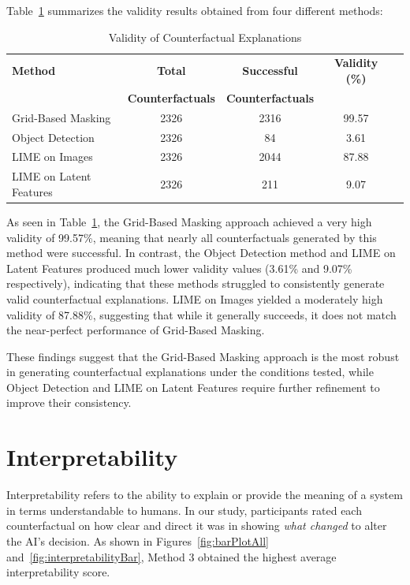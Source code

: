 Table~\ref{tab:validity_results} summarizes the validity results obtained from four different methods:

\begin{table}[htbp]
    \centering
    \caption{Validity of Counterfactual Explanations}
    \label{tab:validity_results}
    \begin{tabular}{lcccc}
        \hline
        \textbf{Method} & \textbf{Total} & \textbf{Successful} & \textbf{Validity (\%)} \\
        & \textbf{Counterfactuals} & \textbf{Counterfactuals} & \\
        \hline
        Grid-Based Masking & 2326 & 2316 & 99.57 \\
        Object Detection & 2326 & 84 & 3.61 \\
        LIME on Images & 2326 & 2044 & 87.88 \\
        LIME on Latent Features & 2326 & 211 & 9.07 \\
        \hline
    \end{tabular}
\end{table}

As seen in Table~\ref{tab:validity_results}, the Grid-Based Masking approach achieved a very high validity of 99.57\%, meaning that nearly all counterfactuals generated by this method were successful. In contrast, the Object Detection method and LIME on Latent Features produced much lower validity values (3.61\% and 9.07\% respectively), indicating that these methods struggled to consistently generate valid counterfactual explanations. LIME on Images yielded a moderately high validity of 87.88\%, suggesting that while it generally succeeds, it does not match the near-perfect performance of Grid-Based Masking.

These findings suggest that the Grid-Based Masking approach is the most robust in generating counterfactual explanations under the conditions tested, while Object Detection and LIME on Latent Features require further refinement to improve their consistency.

\section{Interpretability}
\label{sec:interpretability}
Interpretability refers to the ability to explain or provide the meaning of a system in terms understandable to humans. In our study, 
participants rated each counterfactual on how clear and direct it was in showing \emph{what changed} to alter the AI's decision. 
As shown in Figures~\ref{fig:barPlotAll} and~\ref{fig:interpretabilityBar}, Method 3 obtained the highest average interpretability score.

